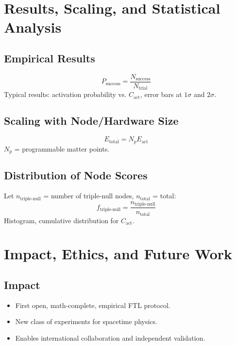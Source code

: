 \documentclass[12pt]{article}
\begin{document}
\newpage
\section{Results, Scaling, and Statistical Analysis}

\subsection{Empirical Results}
\begin{equation}
P_{\text{success}} = \frac{N_{\text{success}}}{N_{\text{trial}}}
\end{equation}
Typical results: activation probability vs. $C_{\text{act}}$, error bars at $1\sigma$ and $2\sigma$.

\subsection{Scaling with Node/Hardware Size}
\begin{equation}
E_{\text{total}} = N_p E_{\text{act}}
\end{equation}
$N_p$ = programmable matter points.

\subsection{Distribution of Node Scores}
Let $n_{\text{triple-null}}$ = number of triple-null nodes, $n_{\text{total}}$ = total:
\begin{equation}
f_{\text{triple-null}} = \frac{n_{\text{triple-null}}}{n_{\text{total}}}
\end{equation}
Histogram, cumulative distribution for $C_{\text{act}}$.

\newpage
\section{Impact, Ethics, and Future Work}

\subsection{Impact}
\begin{itemize}
    \item First open, math-complete, empirical FTL protocol.
    \item New class of experiments for spacetime physics.
    \item Enables international collaboration and independent validation.
\end{itemize}
\end{document}
